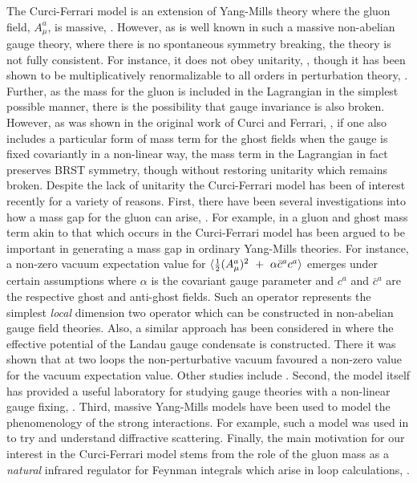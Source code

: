 \documentclass[a4paper,11pt]{article}
\newcommand{\half}{\mbox{\small{$\frac{1}{2}$}}}
\begin{document}
\newpage 
The Curci-Ferrari model is an extension of Yang-Mills theory where the gluon
field, $A^a_\mu$, is massive, \cite{1,2}. However, as is well known in such a
massive non-abelian gauge theory, where there is no spontaneous symmetry 
breaking, the theory is not fully consistent. For instance, it does not obey
unitarity, \cite{2,3,4}, though it has been shown to be multiplicatively
renormalizable to all orders in perturbation theory, \cite{1,4,5,6}. Further, 
as the mass for the gluon is included in the Lagrangian in the simplest 
possible manner, there is the possibility that gauge invariance is also broken.
However, as was shown in the original work of Curci and Ferrari, \cite{1,2}, if
one also includes a particular form of mass term for the ghost fields when the 
gauge is fixed covariantly in a non-linear way, the mass term in the Lagrangian
in fact preserves BRST symmetry, though without restoring unitarity which 
remains broken. Despite the lack of unitarity the Curci-Ferrari model has been 
of interest recently for a variety of reasons. First, there have been several
investigations into how a mass gap for the gluon can arise, \cite{7,8,9}. For 
example, in \cite{8,9} a gluon and ghost mass term akin to that which occurs in
the Curci-Ferrari model has been argued to be important in generating a mass 
gap in ordinary Yang-Mills theories. For instance, a non-zero vacuum 
expectation value for $\langle \half (A_\mu^a)^2 ~+~ \alpha \bar{c}^a c^a
\rangle$ emerges under certain assumptions where $\alpha$ is the covariant
gauge parameter and $c^a$ and $\bar{c}^a$ are the respective ghost and 
anti-ghost fields. Such an operator represents the simplest {\em local}
dimension two operator which can be constructed in non-abelian gauge field 
theories. Also, a similar approach has been considered in \cite{7} where the 
effective potential of the Landau gauge condensate is constructed. There it was 
shown that at two loops the non-perturbative vacuum favoured a non-zero value 
for the vacuum expectation value. Other studies include \cite{10}. Second, the 
model itself has provided a useful laboratory for studying gauge theories with 
a non-linear gauge fixing, \cite{5,11}. Third, massive Yang-Mills models have 
been used to model the phenomenology of the strong interactions. For example, 
such a model was used in \cite{12} to try and understand diffractive 
scattering. Finally, the main motivation for our interest in the Curci-Ferrari 
model stems from the role of the gluon mass as a {\em natural} infrared 
regulator for Feynman integrals which arise in loop calculations, 
\cite{13,6,14}. 
\end{document}
